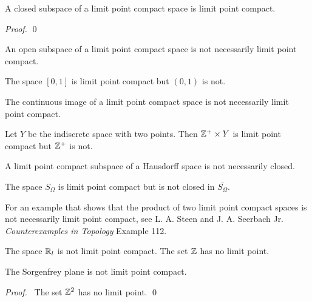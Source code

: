 \begin{proposition}
    A closed subspace of a limit point compact space is limit point compact.
\end{proposition}

\begin{proof}
    \pf
    \qed
\end{proof}

\begin{example}
    An open subspace of a limit point compact space is not necessarily limit point compact.

    The space $[0,1]$ is limit point compact but $(0,1)$ is not.
\end{example}

\begin{example}
    The continuous image of a limit point compact space is not necessarily limit point compact.

    Let $Y$ be the indiscrete space with two points. Then $\mathbb{Z}^+ \times Y$ is limit point compact but $\mathbb{Z}^+$
    is not.
\end{example}

\begin{example}
    A limit point compact subspace of a Hausdorff space is not necessarily closed.

    The space $S_\Omega$ is limit point compact but is not closed in $\overline{S_\Omega}$.
\end{example}

For an example that shows that the product of two limit point compact spaces is not necessarily
limit point compact, see L. A. Steen and J. A. Seerbach Jr. \emph{Counterexamples in
Topology} Example 112.

\begin{example}
    The space $\mathbb{R}_l$ is not limit point compact. The set $\mathbb{Z}$ has no limit point.
\end{example}

\begin{proposition}
    The Sorgenfrey plane is not limit point compact.
\end{proposition}

\begin{proof}
    \pf\ The set $\mathbb{Z}^2$ has no limit point. \qed
\end{proof}

